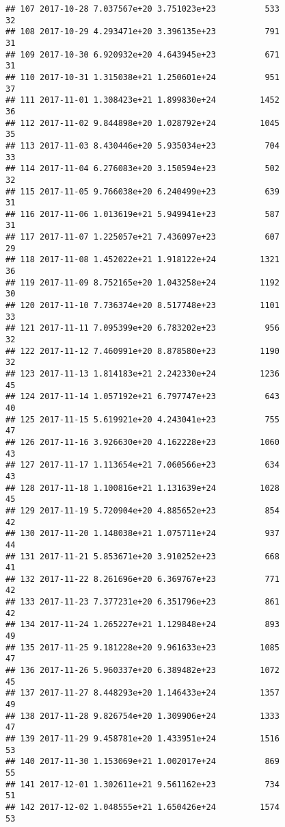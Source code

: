 \documentclass[]{article}
\begin{document}
\begin{verbatim}
## 107 2017-10-28 7.037567e+20 3.751023e+23          533              32
## 108 2017-10-29 4.293471e+20 3.396135e+23          791              31
## 109 2017-10-30 6.920932e+20 4.643945e+23          671              31
## 110 2017-10-31 1.315038e+21 1.250601e+24          951              37
## 111 2017-11-01 1.308423e+21 1.899830e+24         1452              36
## 112 2017-11-02 9.844898e+20 1.028792e+24         1045              35
## 113 2017-11-03 8.430446e+20 5.935034e+23          704              33
## 114 2017-11-04 6.276083e+20 3.150594e+23          502              32
## 115 2017-11-05 9.766038e+20 6.240499e+23          639              31
## 116 2017-11-06 1.013619e+21 5.949941e+23          587              31
## 117 2017-11-07 1.225057e+21 7.436097e+23          607              29
## 118 2017-11-08 1.452022e+21 1.918122e+24         1321              36
## 119 2017-11-09 8.752165e+20 1.043258e+24         1192              30
## 120 2017-11-10 7.736374e+20 8.517748e+23         1101              33
## 121 2017-11-11 7.095399e+20 6.783202e+23          956              32
## 122 2017-11-12 7.460991e+20 8.878580e+23         1190              32
## 123 2017-11-13 1.814183e+21 2.242330e+24         1236              45
## 124 2017-11-14 1.057192e+21 6.797747e+23          643              40
## 125 2017-11-15 5.619921e+20 4.243041e+23          755              47
## 126 2017-11-16 3.926630e+20 4.162228e+23         1060              43
## 127 2017-11-17 1.113654e+21 7.060566e+23          634              43
## 128 2017-11-18 1.100816e+21 1.131639e+24         1028              45
## 129 2017-11-19 5.720904e+20 4.885652e+23          854              42
## 130 2017-11-20 1.148038e+21 1.075711e+24          937              44
## 131 2017-11-21 5.853671e+20 3.910252e+23          668              41
## 132 2017-11-22 8.261696e+20 6.369767e+23          771              42
## 133 2017-11-23 7.377231e+20 6.351796e+23          861              42
## 134 2017-11-24 1.265227e+21 1.129848e+24          893              49
## 135 2017-11-25 9.181228e+20 9.961633e+23         1085              47
## 136 2017-11-26 5.960337e+20 6.389482e+23         1072              45
## 137 2017-11-27 8.448293e+20 1.146433e+24         1357              49
## 138 2017-11-28 9.826754e+20 1.309906e+24         1333              47
## 139 2017-11-29 9.458781e+20 1.433951e+24         1516              53
## 140 2017-11-30 1.153069e+21 1.002017e+24          869              55
## 141 2017-12-01 1.302611e+21 9.561162e+23          734              51
## 142 2017-12-02 1.048555e+21 1.650426e+24         1574              53

\end{verbatim}
\end{document}
